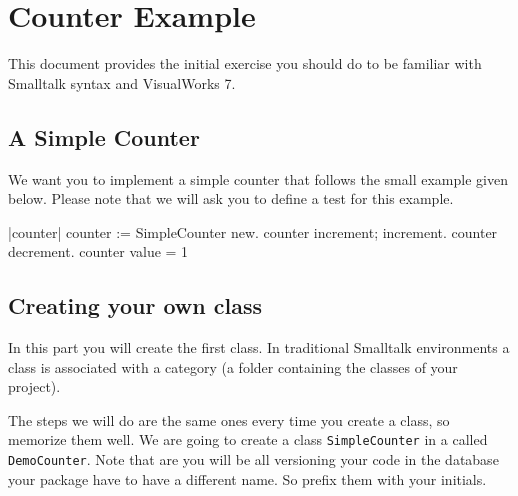 \ifx\wholebook\relax\else


\fi

\chapter{Counter Example}
This document provides the initial exercise you should do to be
familiar with Smalltalk syntax and VisualWorks 7.


\section*{A Simple Counter}
We want you to implement a simple counter that follows the small example given
below. Please note that we will ask you to define a test for this example.

\begin{code}
|counter|
counter := SimpleCounter new.
counter increment; increment.
counter decrement.
counter value = 1
\end{code}


\section*{Creating your own class}
In this part you will create the first class. In traditional Smalltalk environments a class is associated with a category (a folder containing the classes of your project). 

The steps we will do are the same ones every  time you create a class, so memorize them well. We are going to create a class \texttt{SimpleCounter} in a \category called \texttt{DemoCounter}. Note that are you will be all versioning your code in the \store database your package have to have a different name. So prefix them with your initials.



